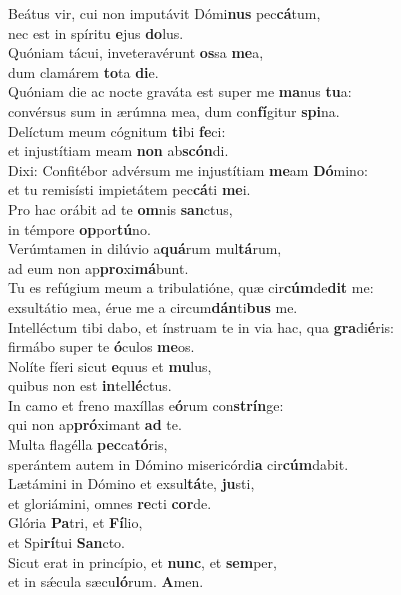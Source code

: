 \evenverse Beátus vir, cui non imputávit Dómi\textbf{nus} pec\textbf{cá}tum,~\*\\
\evenverse nec est in spíritu \textbf{e}jus \textbf{do}lus.\\
\oddverse Quóniam tácui, inveteravérunt \textbf{os}sa \textbf{me}a,~\*\\
\oddverse dum clamárem \textbf{to}ta \textbf{di}e.\\
\evenverse Quóniam die ac nocte graváta est super me \textbf{ma}nus \textbf{tu}a:~\*\\
\evenverse convérsus sum in ærúmna mea, dum con\textbf{fí}gitur \textbf{spi}na.\\
\oddverse Delíctum meum cógnitum \textbf{ti}bi \textbf{fe}ci:~\*\\
\oddverse et injustítiam meam \textbf{non} ab\textbf{scón}di.\\
\evenverse Dixi: Confitébor advérsum me injustítiam \textbf{me}am \textbf{Dó}mino:~\*\\
\evenverse et tu remisísti impietátem pec\textbf{cá}ti \textbf{me}i.\\
\oddverse Pro hac orábit ad te \textbf{om}nis \textbf{san}ctus,~\*\\
\oddverse in témpore \textbf{op}por\textbf{tú}no.\\
\evenverse Verúmtamen in dilúvio a\textbf{quá}rum mul\textbf{tá}rum,~\*\\
\evenverse ad eum non ap\textbf{pro}xi\textbf{má}bunt.\\
\oddverse Tu es refúgium meum a tribulatióne, quæ cir\textbf{cúm}de\textbf{dit} me:~\*\\
\oddverse exsultátio mea, érue me a circum\textbf{dán}ti\textbf{bus} me.\\
\evenverse Intelléctum tibi dabo, et ínstruam te in via hac, qua \textbf{gra}di\textbf{é}ris:~\*\\
\evenverse firmábo super te \textbf{ó}culos \textbf{me}os.\\
\oddverse Nolíte fíeri sicut \textbf{e}quus et \textbf{mu}lus,~\*\\
\oddverse quibus non est \textbf{in}tel\textbf{lé}ctus.\\
\evenverse In camo et freno maxíllas e\textbf{ó}rum con\textbf{strín}ge:~\*\\
\evenverse qui non ap\textbf{pró}ximant \textbf{ad} te.\\
\oddverse Multa flagélla \textbf{pec}ca\textbf{tó}ris,~\*\\
\oddverse sperántem autem in Dómino misericórdi\textbf{a} cir\textbf{cúm}dabit.\\
\evenverse Lætámini in Dómino et exsul\textbf{tá}te, \textbf{ju}sti,~\*\\
\evenverse et gloriámini, omnes \textbf{re}cti \textbf{cor}de.\\
\oddverse Glória \textbf{Pa}tri, et \textbf{Fí}lio,~\*\\
\oddverse et Spi\textbf{rí}tui \textbf{San}cto.\\
\evenverse Sicut erat in princípio, et \textbf{nunc}, et \textbf{sem}per,~\*\\
\evenverse et in sǽcula sæcu\textbf{ló}rum. \textbf{A}men.\\
